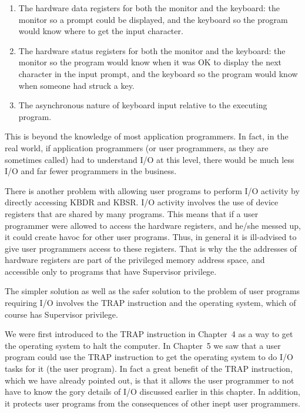 \documentclass{patt}
\begin{document}
\begin{enumerate}
\item The hardware data registers for both the monitor and the keyboard: the
monitor so a prompt could be displayed, and the keyboard so the program
would know where to get the input character.

\item The hardware status registers for both the monitor and the keyboard: the
monitor so the program would know when it was OK to display the next
character in the input prompt, and the keyboard so the program would
know when someone had struck a key.

\item The asynchronous nature of keyboard input relative to the executing program.
\end{enumerate}

This is beyond the knowledge of most application programmers.  In
fact, in the real world, if application programmers (or user
programmers, as they are sometimes called) had to understand I/O at
this level, there would be much less I/O and far fewer programmers in
the business.

There is another problem with allowing user programs to perform I/O
activity by directly accessing KBDR and KBSR.  I/O activity involves
the use of device registers that are shared by many programs.  This
means that if a user programmer were allowed to access the hardware
registers, and he/she messed up, it could create havoc for other user
programs.  Thus, in general it is ill-advised to give user programmers access 
to these registers.  That is why the the addresses of hardware registers are 
part of the privileged memory address space, 
and accessible only to programs that have Supervisor privilege.

The simpler solution as well as the safer solution to the problem of
user programs requiring I/O involves the TRAP instruction and the
operating system, which of course has Supervisor privilege.

We were first introduced to the TRAP instruction in Chapter~4 as a way to
get the operating system to halt the computer.  In Chapter~5 we saw that
a user program could use the TRAP instruction to get the operating system 
to do I/O tasks for it (the user program).  In fact a great benefit of the TRAP
instruction, which we have already pointed out, is that it allows the user 
programmer to not have to know the gory details of I/O discussed earlier 
in this chapter.  In addition, it protects user programs from the 
consequences of other inept user programmers.
\end{document}
